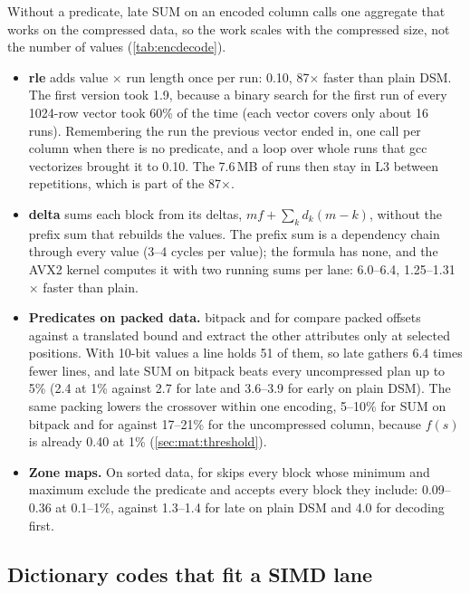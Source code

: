 Without a predicate, late SUM on an encoded column calls one aggregate that works on the
compressed data, so the work scales with the compressed size, not the number of values
(\cref{tab:encdecode}).
\begin{itemize}
\item \textbf{rle} adds value $\times$ run length once per run: 0.10\ms, 87$\times$ faster than
plain DSM. The first version took 1.9\ms, because a binary search for the first run of every
1024-row vector took 60\% of the time (each vector covers only about 16 runs). Remembering the
run the previous vector ended in, one call per column when there is no predicate, and a loop
over whole runs that gcc vectorizes brought it to 0.10\ms. The 7.6\,MB of runs then stay in L3
between repetitions, which is part of the 87$\times$.
\item \textbf{delta} sums each block from its deltas, $m f + \sum_k d_k(m-k)$, without the
prefix sum that rebuilds the values. The prefix sum is a dependency chain through every value
(3--4 cycles per value); the formula has none, and the AVX2 kernel computes it with two
running sums per lane: 6.0--6.4\ms, 1.25--1.31$\times$ faster than plain.
\item \textbf{Predicates on packed data.} bitpack and for compare packed offsets against a
translated bound and extract the other attributes only at selected positions. With 10-bit
values a line holds 51 of them, so late gathers 6.4 times fewer lines, and late SUM on bitpack
beats every uncompressed plan up to 5\% (2.4\ms{} at 1\% against 2.7 for late and 3.6--3.9 for
early on plain DSM). The same packing lowers the crossover within one encoding, 5--10\% for
SUM on bitpack and for against 17--21\% for the uncompressed column, because $f(s)$ is already
0.40 at 1\% (\cref{sec:mat:threshold}).
\item \textbf{Zone maps.} On sorted data, for skips every block whose minimum and maximum
exclude the predicate and accepts every block they include: 0.09--0.36\ms{} at 0.1--1\%,
against 1.3--1.4\ms{} for late on plain DSM and 4.0\ms{} for decoding first.
\end{itemize}

\subsection{Dictionary codes that fit a SIMD lane}
\label{sec:enc:dictb}

\begin{table}[t]
\centering\small
\caption{ on Zipf data in ms: plain DSM, dict (14-bit packed codes) and
dictb (2-byte codes), best of early and late, AVX2. The selectivities are those the Zipf data
allows.}
\label{tab:encdict}
\end{table}

